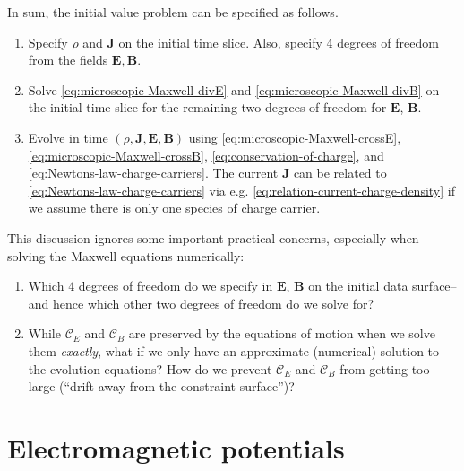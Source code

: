 \documentclass[12pt]{report}
\newcommand{\bB}{{\bm B}}
\newcommand{\bE}{{\bm E}}
\newcommand{\bJ}{{\bm J}}
\begin{document}
In sum, the initial value problem can be specified as follows.
\begin{enumerate}
    \item Specify $\rho$ and $\bJ$ on the initial time slice. Also, specify 4 degrees of freedom from the fields $\bE, \bB$.
    \item Solve \eqref{eq:microscopic-Maxwell-divE} and \eqref{eq:microscopic-Maxwell-divB} on the initial time slice for the remaining two degrees of freedom for $\bE$, $\bB$.
    \item Evolve in time $(\rho,\bJ,\bE,\bB)$ using \eqref{eq:microscopic-Maxwell-crossE}, \eqref{eq:microscopic-Maxwell-crossB}, \eqref{eq:conservation-of-charge}, and \eqref{eq:Newtons-law-charge-carriers}. 
        The current $\bJ$ can be related to \eqref{eq:Newtons-law-charge-carriers} via e.g. \eqref{eq:relation-current-charge-density} if we assume there is only one species of charge carrier.

\end{enumerate}
This discussion ignores some important practical concerns, especially when solving the Maxwell equations numerically:
\begin{enumerate}
    \item Which 4 degrees of freedom do we specify in $\bE$, $\bB$ on the initial data surface--and hence which other two degrees of freedom do we solve for?
    \item While $\mathcal{C}_E$ and $\mathcal{C}_B$ are preserved by the equations of motion when we solve them \emph{exactly}, what if we only have an approximate (numerical) solution to the evolution equations?
        How do we prevent $\mathcal{C}_E$ and $\mathcal{C}_B$ from getting too large (``drift away from the constraint surface'')?
\end{enumerate}

\chapter{Electromagnetic potentials}
\end{document}
